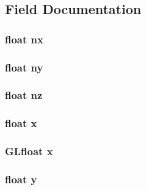 \subsection{Field Documentation}
\hypertarget{struct_vertex_a74d17801d3876700834f1b5eca4605f7}{
\subsubsection[{nx}]{\setlength{\rightskip}{0pt plus 5cm}float nx}}\label{struct_vertex_a74d17801d3876700834f1b5eca4605f7}
\hypertarget{struct_vertex_a9c79b33ae8c9c2a5388a32077d5eed37}{
\subsubsection[{ny}]{\setlength{\rightskip}{0pt plus 5cm}float ny}}\label{struct_vertex_a9c79b33ae8c9c2a5388a32077d5eed37}
\hypertarget{struct_vertex_a8c50d0e8d34556fe8e48394c315c12fd}{
\subsubsection[{nz}]{\setlength{\rightskip}{0pt plus 5cm}float nz}}\label{struct_vertex_a8c50d0e8d34556fe8e48394c315c12fd}
\hypertarget{struct_vertex_ad0da36b2558901e21e7a30f6c227a45e}{
\subsubsection[{x}]{\setlength{\rightskip}{0pt plus 5cm}float x}}\label{struct_vertex_ad0da36b2558901e21e7a30f6c227a45e}
\hypertarget{struct_vertex_a8c0375fe22dfa4d910b93f7f270c4097}{
\subsubsection[{x}]{\setlength{\rightskip}{0pt plus 5cm}G\-Lfloat x}}\label{struct_vertex_a8c0375fe22dfa4d910b93f7f270c4097}
\hypertarget{struct_vertex_aa4f0d3eebc3c443f9be81bf48561a217}{
\subsubsection[{y}]{\setlength{\rightskip}{0pt plus 5cm}float y}}\label{struct_vertex_aa4f0d3eebc3c443f9be81bf48561a217}
